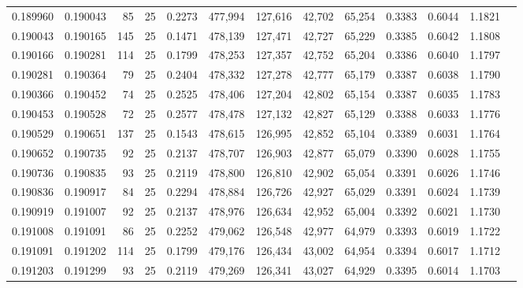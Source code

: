 \begin{tabular}{rrrrrrrrrrrrr}
0.189960 & 0.190043 &    85 &  25 &                                     0.2273 & 477,994 & 127,616 &  42,702 &  65,254 & 0.3383 & 0.6044 & 1.1821 \\
0.190043 & 0.190165 &   145 &  25 &                                     0.1471 & 478,139 & 127,471 &  42,727 &  65,229 & 0.3385 & 0.6042 & 1.1808 \\
0.190166 & 0.190281 &   114 &  25 &                                     0.1799 & 478,253 & 127,357 &  42,752 &  65,204 & 0.3386 & 0.6040 & 1.1797 \\
0.190281 & 0.190364 &    79 &  25 &                                     0.2404 & 478,332 & 127,278 &  42,777 &  65,179 & 0.3387 & 0.6038 & 1.1790 \\
0.190366 & 0.190452 &    74 &  25 &                                     0.2525 & 478,406 & 127,204 &  42,802 &  65,154 & 0.3387 & 0.6035 & 1.1783 \\
0.190453 & 0.190528 &    72 &  25 &                                     0.2577 & 478,478 & 127,132 &  42,827 &  65,129 & 0.3388 & 0.6033 & 1.1776 \\
0.190529 & 0.190651 &   137 &  25 &                                     0.1543 & 478,615 & 126,995 &  42,852 &  65,104 & 0.3389 & 0.6031 & 1.1764 \\
0.190652 & 0.190735 &    92 &  25 &                                     0.2137 & 478,707 & 126,903 &  42,877 &  65,079 & 0.3390 & 0.6028 & 1.1755 \\
0.190736 & 0.190835 &    93 &  25 &                                     0.2119 & 478,800 & 126,810 &  42,902 &  65,054 & 0.3391 & 0.6026 & 1.1746 \\
0.190836 & 0.190917 &    84 &  25 &                                     0.2294 & 478,884 & 126,726 &  42,927 &  65,029 & 0.3391 & 0.6024 & 1.1739 \\
0.190919 & 0.191007 &    92 &  25 &                                     0.2137 & 478,976 & 126,634 &  42,952 &  65,004 & 0.3392 & 0.6021 & 1.1730 \\
0.191008 & 0.191091 &    86 &  25 &                                     0.2252 & 479,062 & 126,548 &  42,977 &  64,979 & 0.3393 & 0.6019 & 1.1722 \\
0.191091 & 0.191202 &   114 &  25 &                                     0.1799 & 479,176 & 126,434 &  43,002 &  64,954 & 0.3394 & 0.6017 & 1.1712 \\
0.191203 & 0.191299 &    93 &  25 &                                     0.2119 & 479,269 & 126,341 &  43,027 &  64,929 & 0.3395 & 0.6014 & 1.1703 \\

\end{tabular}

